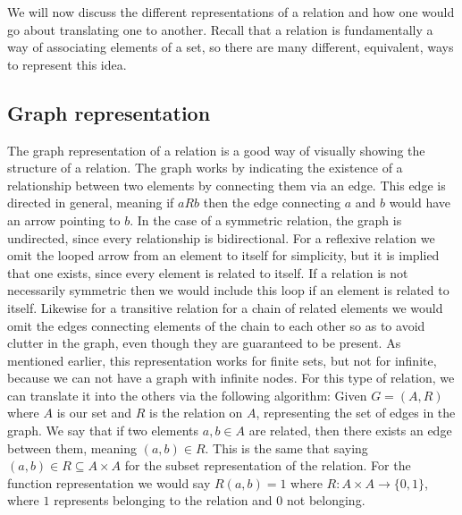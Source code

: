 \documentclass{article}
\begin{document}
We will now discuss the different representations of a relation and how one would go about translating one to another. Recall that a relation is fundamentally a way of associating elements of a set, so there are many different, equivalent, ways to represent this idea.

\subsection{Graph representation}
The graph representation of a relation is a good way of visually showing the structure of a relation. The graph works by indicating the existence of a relationship between two elements by connecting them via an edge. This edge is directed in general, meaning if $aRb$ then the edge connecting $a$ and $b$ would have an arrow pointing to $b$. In the case of a symmetric relation, the graph is undirected, since every relationship is bidirectional. For a reflexive relation we omit the looped arrow from an element to itself for simplicity, but it is implied that one exists, since every element is related to itself. If a relation is not necessarily symmetric then we would include this loop if an element is related to itself. Likewise for a transitive relation for a chain of related elements we would omit the edges connecting elements of the chain to each other so as to avoid clutter in the graph, even though they are guaranteed to be present. As mentioned earlier, this representation works for finite sets, but not for infinite, because we can not have a graph with infinite nodes. For this type of relation, we can translate it into the others via the following algorithm: Given $G = (A,R)$ where $A$ is our set and $R$ is the relation on $A$, representing the set of edges in the graph. We say that if two elements $a,b\in A$ are related, then there exists an edge between them, meaning $(a,b)\in R$. This is the same that saying $(a,b)\in R \subseteq A\times A$ for the subset representation of the relation. For the function representation we would say $R(a,b) = 1$ where $R:A\times A\to \{0,1\}$, where $1$ represents belonging to the relation and $0$ not belonging. 
\end{document}
